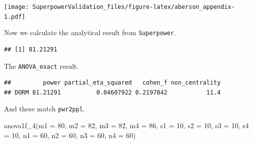 \documentclass[
]{book}
\newenvironment{Shaded}{\begin{snugshade}}{\end{snugshade}}
\newcommand{\AttributeTok}[1]{\textcolor[rgb]{0.77,0.63,0.00}{#1}}
\newcommand{\ConstantTok}[1]{\textcolor[rgb]{0.00,0.00,0.00}{#1}}
\newcommand{\DecValTok}[1]{\textcolor[rgb]{0.00,0.00,0.81}{#1}}
\newcommand{\FunctionTok}[1]{\textcolor[rgb]{0.00,0.00,0.00}{#1}}
\newcommand{\NormalTok}[1]{#1}
\newcommand{\OtherTok}[1]{\textcolor[rgb]{0.56,0.35,0.01}{#1}}
\newcommand{\SpecialCharTok}[1]{\textcolor[rgb]{0.00,0.00,0.00}{#1}}
\begin{document}
\texttt{[image: SuperpowerValidation\_files/figure-latex/aberson\_appendix-1.pdf]}

Now we calculate the analytical result from \texttt{Superpower}.

\begin{Shaded}
\end{Shaded}

\begin{verbatim}
## [1] 81.21291
\end{verbatim}

The \texttt{ANOVA\_exact} result.

\begin{Shaded}
\end{Shaded}

\begin{verbatim}
##         power partial_eta_squared   cohen_f non_centrality
## DORM 81.21291          0.04607922 0.2197842           11.4
\end{verbatim}

And these match \texttt{pwr2ppl}.

\begin{Shaded}
\begin{Highlighting}[]
\FunctionTok{anova1f\_4}\NormalTok{(}\AttributeTok{m1 =} \DecValTok{80}\NormalTok{, }\AttributeTok{m2 =} \DecValTok{82}\NormalTok{, }\AttributeTok{m3 =} \DecValTok{82}\NormalTok{, }\AttributeTok{m4 =} \DecValTok{86}\NormalTok{,}
          \AttributeTok{s1 =} \DecValTok{10}\NormalTok{, }\AttributeTok{s2 =} \DecValTok{10}\NormalTok{, }\AttributeTok{s3 =} \DecValTok{10}\NormalTok{, }\AttributeTok{s4 =} \DecValTok{10}\NormalTok{,}
          \AttributeTok{n1 =} \DecValTok{60}\NormalTok{, }\AttributeTok{n2 =} \DecValTok{60}\NormalTok{, }\AttributeTok{n3 =} \DecValTok{60}\NormalTok{, }\AttributeTok{n4 =} \DecValTok{60}\NormalTok{)}
\end{Highlighting}
\end{Shaded}
\end{document}
